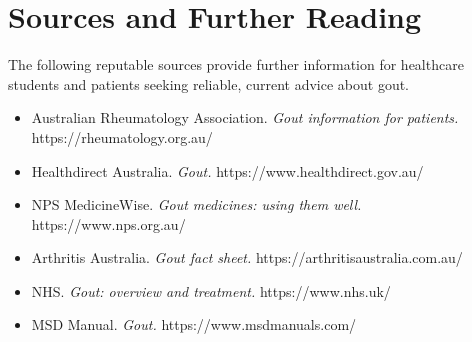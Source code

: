 \section*{Sources and Further Reading}
The following reputable sources provide further information for healthcare students and patients seeking reliable, current advice about gout.

\begin{itemize}
    \item Australian Rheumatology Association. \textit{Gout information for patients.} https://rheumatology.org.au/
    \item Healthdirect Australia. \textit{Gout.} https://www.healthdirect.gov.au/
    \item NPS MedicineWise. \textit{Gout medicines: using them well.} https://www.nps.org.au/
    \item Arthritis Australia. \textit{Gout fact sheet.} https://arthritisaustralia.com.au/
    \item NHS. \textit{Gout: overview and treatment.} https://www.nhs.uk/
    \item MSD Manual. \textit{Gout.} https://www.msdmanuals.com/
\end{itemize}
